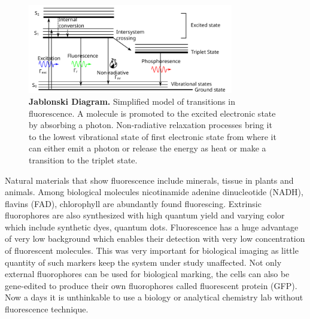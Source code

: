 \begin{figure}
	\centering
	\includegraphics[width=0.8\textwidth]{jablonski}
	\caption{\textbf{Jablonski Diagram.} Simplified model of transitions in fluorescence. A molecule is promoted to the excited electronic state by absorbing a photon. Non-radiative relaxation processes bring it to the lowest vibrational state of first electronic state from where it can either emit a photon or release the energy as heat or make a transition to the triplet state.}
	\label{fig:jablonski}
\end{figure}

Natural materials that show fluorescence include minerals, tissue in plants and animals.
Among biological molecules nicotinamide adenine dinucleotide (NADH), flavins (FAD), chlorophyll are abundantly found fluorescing.\cite{blacker2014separating,siano1989nadh,genty1989the}
Extrinsic fluorophores are also synthesized with high quantum yield and varying color which include synthetic dyes, quantum dots.\cite{atkinson1952the,alivisatos1996semiconductor}
Fluorescence has a huge advantage of very low background which enables their detection with very low concentration of fluorescent molecules.
This was very important for biological imaging as little quantity of such markers keep the system under study unaffected.\cite{white1987an}
Not only external fluorophores can be used for biological marking, the cells can also be gene-edited to produce their own fluorophores called fluorescent protein (GFP).\cite{tsien1998the,chalfie1994green}
Now a days it is unthinkable to use a biology or analytical chemistry lab without fluorescence technique.

